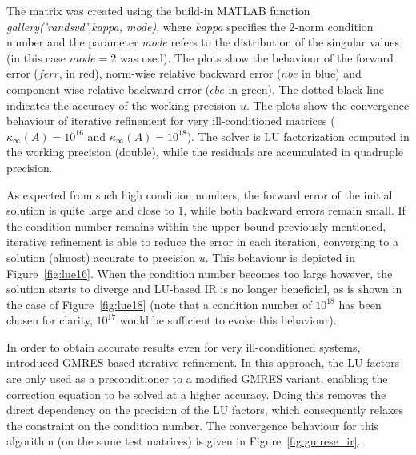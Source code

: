 The matrix was created using the build-in MATLAB function \textit{gallery('randsvd',kappa, mode)}, where \textit{kappa} specifies the 2-norm condition number and the parameter \textit{mode} refers to the distribution of the singular values (in this case $mode=2$ was used). The plots show the behaviour of the forward error ($ferr$, in red), norm-wise relative backward error ($nbe$ in blue) and component-wise relative backward error ($cbe$ in green). The dotted black line indicates the accuracy of the working precision $u$. The plots show the convergence behaviour of iterative refinement for very ill-conditioned matrices ($\kappa_\infty(A)=10^{16}$ and $\kappa_\infty(A)=10^{18}$). The solver is LU factorization computed in the working precision (double), while the residuals are accumulated in quadruple precision.

As expected from such high condition numbers, the forward error of the initial solution is quite large and close to $1$, while both backward errors remain small. If the condition number remains within the upper bound previously mentioned, iterative refinement is able to reduce the error in each iteration, converging to a solution (almost) accurate to precision $u$. This behaviour is depicted in Figure~\hyperref[fig:lue16]{\ref{fig:lue16}}. When the condition number becomes too large however, the solution starts to diverge and LU-based IR is no longer beneficial, as is shown in the case of Figure~\hyperref[fig:lue18]{\ref{fig:lue18}} (note that a condition number of $10^{18}$ has been chosen for clarity, $10^{17}$ would be sufficient to evoke this behaviour).

In order to obtain accurate results even for very ill-conditioned systems, \cite{carson_new_2017} introduced GMRES-based iterative refinement. In this approach, the LU factors are only used as a preconditioner to a modified GMRES variant, enabling the correction equation to be solved at a higher accuracy. Doing this removes the direct dependency on the precision of the LU factors, which consequently relaxes the constraint on the condition number. The convergence behaviour for this algorithm (on the same test matrices) is given in Figure~\hyperref[fig:gmrese_ir]{\ref{fig:gmrese_ir}}.

